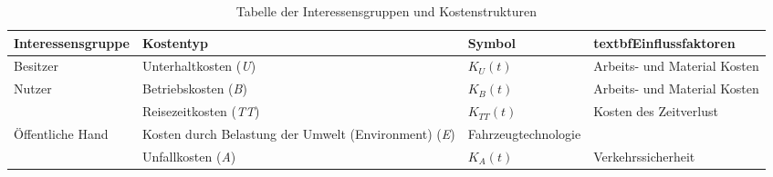 %
%
%
%

\begin{table}[h!]
\flushleft
\renewcommand{\arraystretch}{1.4}
%
%
\begin{tabular}{@{}p{3.3cm} p{4cm} p{1cm} l @{}} \\   
\toprule
\textbf{Interessensgruppe} & \textbf{Kostentyp} & \textbf{Symbol} & textbf{Einflussfaktoren} 			\\
\midrule
Besitzer                   & Unterhaltkosten (\textit{U})                    & $K_{U}(t)$    & Arbeits- und Material Kosten              \\
Nutzer		               & Betriebskosten (\textit{B})                     & $K_{B}(t)$    & Arbeits- und Material Kosten                     \\
                           & Reisezeitkosten (\textit{TT})            		 & $K_{TT}(t)$   & Kosten des Zeitverlust  \\
Öffentliche Hand           & Kosten durch Belastung \newline der Umwelt \newline (Environment) (\textit{E})   &  Fahrzeugtechnologie      \\
                           & Unfallkosten (\textit{A})                       & $K_{A}(t)$    & Verkehrssicherheit    \\
\bottomrule

\end{tabular}
\caption{Tabelle der Interessensgruppen und Kostenstrukturen}
\label{tab:t-04-01-Interessensgruppen}
\end{table}


%


